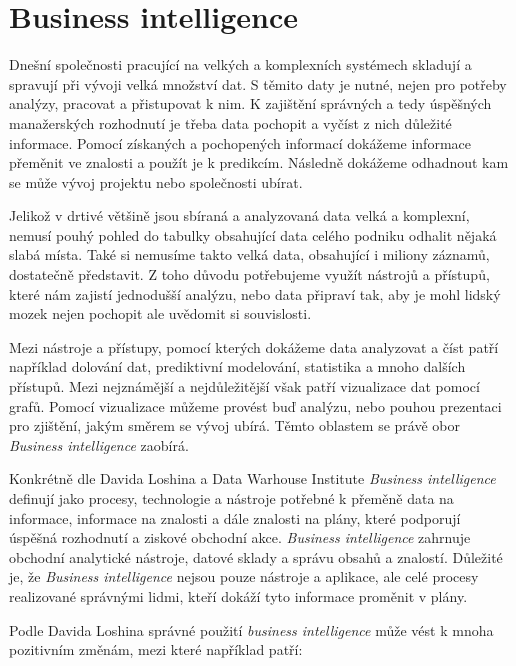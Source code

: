 \documentclass[czech,master]{diploma}
\begin{document}
\newpage %
\chapter{Business intelligence}
Dnešní společnosti pracující na velkých a komplexních systémech skladují a spravují při vývoji velká množství dat. S těmito daty je nutné, nejen pro potřeby analýzy, pracovat a přistupovat k nim. K zajištění správných a tedy úspěšných manažerských rozhodnutí je třeba data pochopit a vyčíst z nich důležité informace. Pomocí získaných a pochopených informací dokážeme informace přeměnit ve znalosti a použít je k predikcím. Následně dokážeme odhadnout kam se může vývoj projektu nebo společnosti ubírat.

Jelikož v drtivé většině jsou sbíraná a analyzovaná data velká a komplexní, nemusí pouhý pohled do tabulky obsahující data celého podniku odhalit nějaká slabá místa. Také si nemusíme takto velká data, obsahující i miliony záznamů, dostatečně představit. Z toho důvodu potřebujeme využít nástrojů a přístupů, které nám zajistí jednodušší analýzu, nebo data připraví tak, aby je mohl lidský mozek nejen pochopit ale uvědomit si souvislosti.

Mezi nástroje a přístupy, pomocí kterých dokážeme data analyzovat a číst patří například dolování dat, prediktivní modelování, statistika a mnoho dalších přístupů. Mezi nejznámější a nejdůležitější však patří vizualizace dat pomocí grafů. Pomocí vizualizace můžeme provést buď analýzu, nebo pouhou prezentaci pro zjištění, jakým směrem se vývoj ubírá. Těmto oblastem se právě obor \textit{Business intelligence} zaobírá.

Konkrétně dle Davida Loshina \cite{ref:bi_loshin_david} a Data Warhouse Institute \textit{Business intelligence} definují jako procesy, technologie a nástroje potřebné k přeměně data na informace, informace na znalosti a dále znalosti na plány, které podporují úspěšná rozhodnutí a ziskové obchodní akce. \textit{Business intelligence} zahrnuje obchodní analytické nástroje, datové sklady a správu obsahů a znalostí. Důležité je, že \textit{Business intelligence} nejsou pouze nástroje a aplikace, ale celé procesy realizované správnými lidmi, kteří dokáží tyto informace proměnit v plány.

Podle Davida Loshina \cite{ref:bi_loshin_david} správné použití \textit{business intelligence} může vést k mnoha pozitivním změnám, mezi které například patří:
\end{document}
